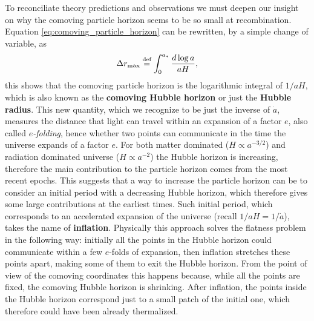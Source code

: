 To reconciliate theory predictions and observations we must deepen our insight on why the comoving particle horizon seems to be so small at recombination. Equation \eqref{eq:comoving_particle_horizon} can be rewritten, by a simple change of variable, as
$$\Delta r_{\text{max}}\stackrel{\text{def}}{=}\int_0^{a_{*}}\frac{d\log a}{aH},$$
this shows that the comoving particle horizon is the logarithmic integral of $1/aH$, which is also known as the \textbf{comoving Hubble horizon} or just the \textbf{Hubble radius}. This new quantity, which we recognize to be just the inverse of $\dot a$, measures the distance that light can travel within an expansion of a factor $e$, also called \emph{$e$-folding}, hence whether two points can communicate in the time the universe expands of a factor $e$. For both matter dominated ($H\propto a^{-3/2}$) and radiation dominated universe ($H\propto a ^{-2}$) the Hubble horizon is increasing, therefore the main contribution to the particle horizon comes from the most recent epochs. This suggests that a way to increase the particle horizon can be to consider an initial period with a decreasing Hubble horizon, which therefore gives some large contributions at the earliest times. Such initial period, which corresponds to an accelerated expansion of the universe (recall $1/aH=1/\dot a$), takes the name of \textbf{inflation}. Physically this approach solves the flatness problem in the following way: initially all the points in the Hubble horizon could communicate within a few $e$-folds of expansion, then inflation stretches these points apart, making some of them to exit the Hubble horizon. From the point of view of the comoving coordinates this happens because, while all the points are fixed, the comoving Hubble horizon is shrinking. After inflation, the points inside the Hubble horizon correspond just to a small patch of the initial one, which therefore could have been already thermalized.
